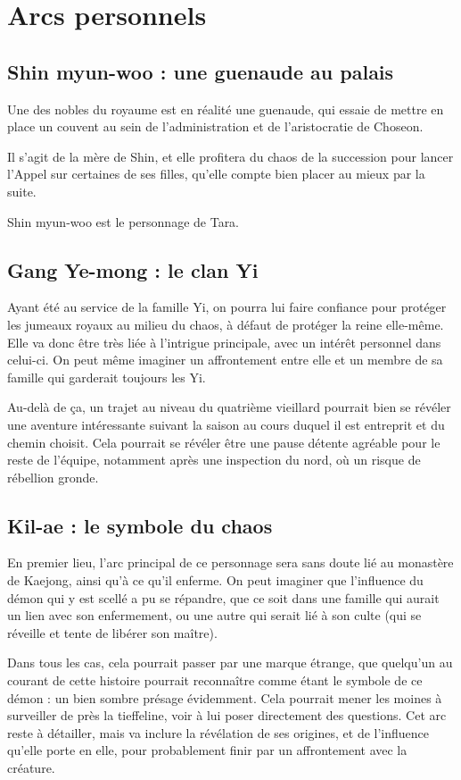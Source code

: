 \documentclass[10pt,a4paper]{book}
\begin{document}
\section{Arcs personnels}
\subsection{Shin myun-woo : une guenaude au palais}
Une des nobles du royaume est en réalité une guenaude, qui essaie de mettre en place un couvent au sein de l'administration et de l'aristocratie de Choseon.

Il s'agit de la mère de Shin, et elle profitera du chaos de la succession pour lancer l'Appel sur certaines de ses filles, qu'elle compte bien placer au mieux par la suite.

Shin myun-woo est le personnage de Tara.
\subsection{Gang Ye-mong : le clan Yi}
Ayant été au service de la famille Yi, on pourra lui faire confiance pour protéger les jumeaux royaux au milieu du chaos, à défaut de protéger la reine elle-même. Elle va donc être très liée à l'intrigue principale, avec un intérêt personnel dans celui-ci. On peut même imaginer un affrontement entre elle et un membre de sa famille qui garderait toujours les Yi.

Au-delà de ça, un trajet au niveau du quatrième vieillard pourrait bien se révéler une aventure intéressante suivant la saison au cours duquel il est entreprit et du chemin choisit. Cela pourrait se révéler être une pause détente agréable pour le reste de l'équipe, notamment après une inspection du nord, où un risque de rébellion gronde.


\subsection{Kil-ae : le symbole du chaos}
En premier lieu, l'arc principal de ce personnage sera sans doute lié au monastère de Kaejong, ainsi qu'à ce qu'il enferme. On peut imaginer que l'influence du démon qui y est scellé a pu se répandre, que ce soit dans une famille qui aurait un lien avec son enfermement, ou une autre qui serait lié à son culte (qui se réveille et tente de libérer son maître).

Dans tous les cas, cela pourrait passer par une marque étrange, que quelqu'un au courant de cette histoire pourrait reconnaître comme étant le symbole de ce démon : un bien sombre présage évidemment. Cela pourrait mener les moines à surveiller de près la tieffeline, voir à lui poser directement des questions. Cet arc reste à détailler, mais va inclure la révélation de ses origines, et de l'influence qu'elle porte en elle, pour probablement finir par un affrontement avec la créature.
\end{document}
